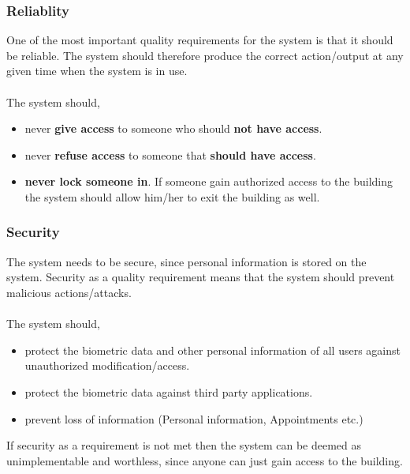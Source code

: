 \subsubsection{Reliablity}
One of the most important quality requirements for the system is that it should be reliable.
The system should therefore produce the correct action/output at any given time when the system is in use.\\
\\The system should,
\begin{itemize}
	\item  never \textbf{give access} to someone who should \textbf{not have access}.
	\item  never \textbf{refuse access} to someone that\textbf{ should have access}. 
	\item  \textbf{never lock someone in}. If someone gain authorized access to the building the system should 				allow him/her to exit the building as well.
\end{itemize}

\subsubsection{Security}
The system needs to be secure, since personal information is stored on the system. Security as a quality requirement means that the system should prevent malicious actions/attacks.\\
\\The system should,
\begin{itemize}
	\item  protect the biometric data and other personal information of all users against unauthorized modification/access.
	\item  protect the biometric data against third party applications.
	\item  prevent loss of information (Personal information, Appointments etc.)
\end{itemize}

If security as a requirement is not met then the system can be deemed as unimplementable and worthless, since anyone can just gain access to the building.

